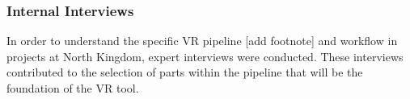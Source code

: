\subsubsection{Internal Interviews}
In order to understand the specific VR pipeline [add footnote] and workflow in projects at North Kingdom, expert interviews were conducted. These interviews contributed to the selection of parts within the pipeline that will be the foundation of the VR tool.
